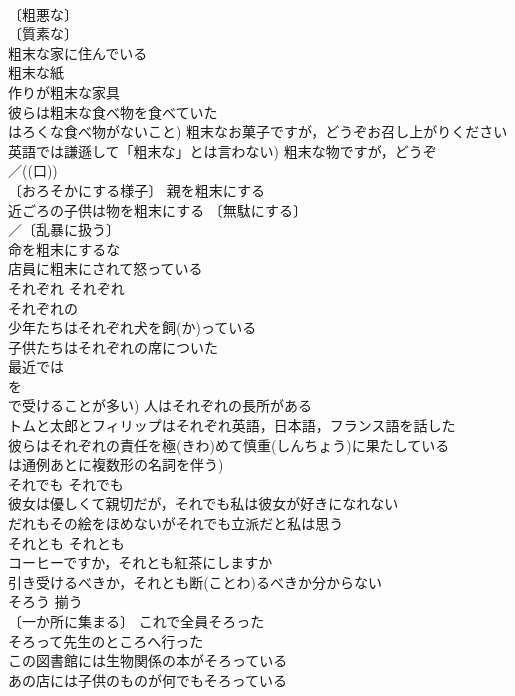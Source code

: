 \documentclass[8pt]{extreport}
\begin{document}
\begin{CJK}{UTF8}{min}
\\	〔粗悪な〕
\\	〔質素な〕
\\	粗末な家に住んでいる 
\\	粗末な紙 
\\	作りが粗末な家具 
\\	彼らは粗末な食べ物を食べていた 
\\	はろくな食べ物がないこと) 粗末なお菓子ですが，どうぞお召し上がりください 
\\	英語では謙遜して「粗末な」とは言わない) 粗末な物ですが，どうぞ 
\\	／((口)) 
\\	〔おろそかにする様子〕 親を粗末にする 
\\	近ごろの子供は物を粗末にする 〔無駄にする〕
\\	／〔乱暴に扱う〕
\\	命を粗末にするな 
\\	店員に粗末にされて怒っている 
\\	それぞれ	それぞれ	
\\	それぞれの 
\\	少年たちはそれぞれ犬を飼(か)っている 
\\	子供たちはそれぞれの席についた 
\\	最近では
\\	を
\\	で受けることが多い) 人はそれぞれの長所がある 
\\	トムと太郎とフィリップはそれぞれ英語，日本語，フランス語を話した 
\\	彼らはそれぞれの責任を極(きわ)めて慎重(しんちょう)に果たしている 
\\	は通例あとに複数形の名詞を伴う)
\\	それでも	それでも	
\\	彼女は優しくて親切だが，それでも私は彼女が好きになれない
\\	だれもその絵をほめないがそれでも立派だと私は思う
\\	それとも	それとも	
\\	コーヒーですか，それとも紅茶にしますか 
\\	引き受けるべきか，それとも断(ことわ)るべきか分からない 
\\	そろう	揃う	
\\	〔一か所に集まる〕 これで全員そろった 
\\	そろって先生のところへ行った 
\\	この図書館には生物関係の本がそろっている 
\\	あの店には子供のものが何でもそろっている 

\end{CJK}
\end{document}
